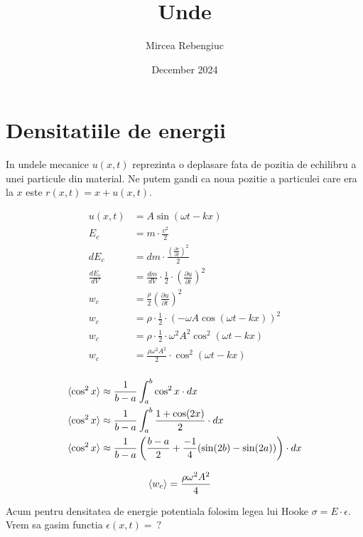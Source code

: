 \documentclass{article}
\title{Unde}
\author{Mircea Rebengiuc}
\date{December 2024}
\begin{document}
\maketitle

\section{Densitatiile de energii}

In undele mecanice $u(x, t)$ reprezinta o deplasare fata de pozitia de echilibru a unei particule din material. Ne putem gandi ca noua pozitie a particulei care era la $x$ este $r(x, t) = x + u(x, t)$.

\begin{align*}
    u(x, t) &= A\sin(\omega t - kx) \\
    E_c &= m\cdot \frac{v^2}{2} \\
    dE_c &= dm \cdot \frac{(\frac{\partial r}{\partial t})^2}{2} \\
    \frac{dE_c}{dV} &= \frac{dm}{dV}\cdot \frac{1}{2}\cdot (\frac{\partial u}{\partial t})^2 \\
    w_c &= \frac{\rho}{2}\left(\frac{\partial u}{\partial t}\right)^2\\
    w_c &= \rho\cdot \frac{1}{2}\cdot (-\omega A\cos(\omega t - kx))^2 \\
    w_c &= \rho\cdot \frac{1}{2}\cdot \omega^2 A^2\cos^2(\omega t - kx) \\
    w_c &= \frac{\rho\omega^2 A^2}{2}\cdot \cos^2(\omega t - kx) \\
\end{align*}

\begin{align*}
    \braket{\cos^2x} &\approx \frac{1}{b-a}\int_a^b\cos^2x\cdot dx \\
    \braket{\cos^2x} &\approx \frac{1}{b-a}\int_a^b\frac{1+\cos(2x)}{2}\cdot dx \\
    \braket{\cos^2x} &\approx \frac{1}{b-a}\left(\frac{b-a}{2}+\frac{-1}{4}(\sin(2b) - \sin(2a))\right)\cdot dx \\
\end{align*}

\begin{align*}
    \braket{w_c} &= \frac{\rho\omega^2 A^2}{4}
\end{align*}

Acum pentru densitatea de energie potentiala folosim legea lui Hooke $\sigma = E\cdot \epsilon$. Vrem sa gasim functia $\epsilon(x, t) = \:?$
\end{document}

